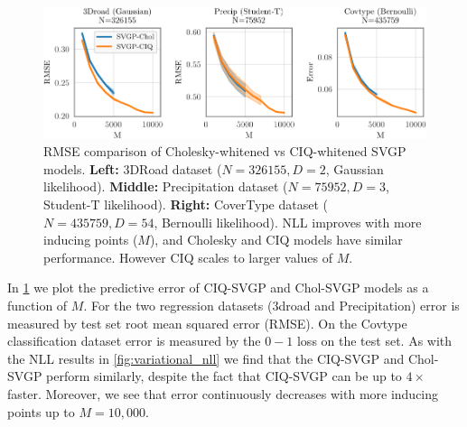 \begin{figure}[ht!]
  \centering
  \includegraphics[width=\linewidth]{figures/variational_error.pdf}
  \caption[RMSE comparison of Cholesky-whitened vs CIQ-whitened SVGP models.]{
    RMSE comparison of Cholesky-whitened vs CIQ-whitened SVGP models.
    {\bf Left:} 3DRoad dataset ($N=326155, D=2$, Gaussian likelihood).
    {\bf Middle:} Precipitation dataset ($N=75952, D=3$, Student-T likelihood).
    {\bf Right:} CoverType dataset ($N=435759, D=54$, Bernoulli likelihood).
    NLL improves with more inducing points ($M$), and Cholesky and CIQ models have similar performance.
    However CIQ scales to larger values of $M$.
  }
  \label{fig:variational_error}
\end{figure}

In \cref{fig:variational_error} we plot the predictive error of CIQ-SVGP and Chol-SVGP models as a function of $M$.
For the two regression datasets (3droad and Precipitation) error is measured by test set root mean squared error (RMSE).
On the Covtype classification dataset error is measured by the $0-1$ loss on the test set.
As with the NLL results in \cref{fig:variational_nll} we find that the CIQ-SVGP and Chol-SVGP perform similarly, despite the fact that CIQ-SVGP can be up to $4\times$ faster.
Moreover, we see that error continuously decreases with more inducing points up to $M=10,\!000$.
